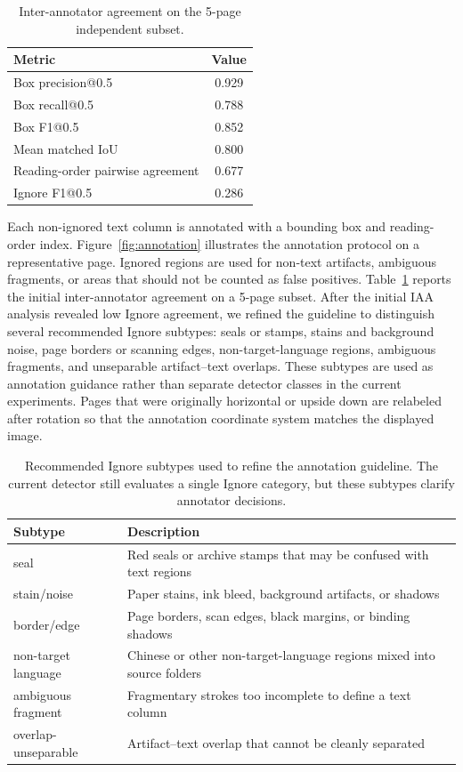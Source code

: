 \documentclass[12pt]{article}
\begin{document}
\begin{table}[t]
\centering
\scriptsize\setlength{\tabcolsep}{3pt}
\caption{Inter-annotator agreement on the 5-page independent subset.}
\label{tab:iaa}
\begin{tabular}{lc}
\toprule
Metric & Value \\
\midrule
Box precision@0.5 & 0.929 \\
Box recall@0.5 & 0.788 \\
Box F1@0.5 & 0.852 \\
Mean matched IoU & 0.800 \\
Reading-order pairwise agreement & 0.677 \\
Ignore F1@0.5 & 0.286 \\
\bottomrule
\end{tabular}
\end{table}

Each non-ignored text column is annotated with a bounding box and reading-order index. Figure~\ref{fig:annotation} illustrates the annotation protocol on a representative page. Ignored regions are used for non-text artifacts, ambiguous fragments, or areas that should not be counted as false positives. Table~\ref{tab:iaa} reports the initial inter-annotator agreement on a 5-page subset. After the initial IAA analysis revealed low Ignore agreement, we refined the guideline to distinguish several recommended Ignore subtypes: seals or stamps, stains and background noise, page borders or scanning edges, non-target-language regions, ambiguous fragments, and unseparable artifact--text overlaps. These subtypes are used as annotation guidance rather than separate detector classes in the current experiments. Pages that were originally horizontal or upside down are relabeled after rotation so that the annotation coordinate system matches the displayed image.

\begin{table}[t]
\centering
\scriptsize\setlength{\tabcolsep}{3pt}
\caption{Recommended Ignore subtypes used to refine the annotation guideline. The current detector still evaluates a single Ignore category, but these subtypes clarify annotator decisions.}
\label{tab:ignore_subtypes}
\begin{tabular}{lp{}}
\toprule
Subtype & Description \\
\midrule
seal & Red seals or archive stamps that may be confused with text regions \\
stain/noise & Paper stains, ink bleed, background artifacts, or shadows \\
border/edge & Page borders, scan edges, black margins, or binding shadows \\
non-target language & Chinese or other non-target-language regions mixed into source folders \\
ambiguous fragment & Fragmentary strokes too incomplete to define a text column \\
overlap-unseparable & Artifact--text overlap that cannot be cleanly separated \\
\bottomrule
\end{tabular}
\end{table}
\end{document}
